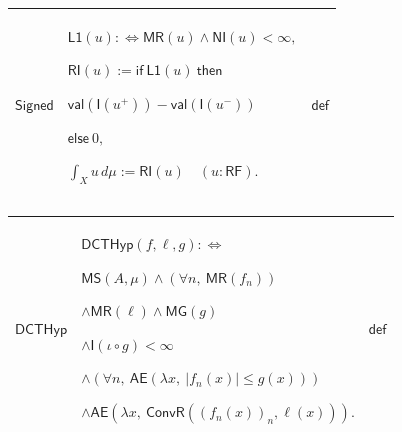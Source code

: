 \documentclass[11pt]{amsart}
\newlength{\FTCThreeColumnBody}
\begin{document}
{\begin{tabular}{|@{}>{\centering\arraybackslash}m{0.251968\FTCThreeColumnBody}|>{\centering\arraybackslash}m{0.590551\FTCThreeColumnBody}|>{\centering\arraybackslash}m{0.157480\FTCThreeColumnBody}|}
\end{tabular}%
\par\setlength{\parskip}{0pt}\nointerlineskip
\noindent
\begin{tabular}{|@{}>{\centering\arraybackslash}m{0.251968\FTCThreeColumnBody}|>{\centering\arraybackslash}m{0.590551\FTCThreeColumnBody}|>{\centering\arraybackslash}m{0.157480\FTCThreeColumnBody}|}\hline
\hypertarget{dctdef:Signed}{$\displaystyle \textsf{Signed}$} & $\displaystyle \textsf{L1}(u):\Longleftrightarrow\textsf{MR}(u)\land\textsf{NI}(u)<\infty,$\par
$\displaystyle \textsf{RI}(u):=\textsf{if}\ \textsf{L1}(u)\ \textsf{then}$\par
$\displaystyle \textsf{val}(\textsf{I}(u^+))-\textsf{val}(\textsf{I}(u^-))$\par
$\displaystyle \textsf{else}\ 0,$\par
$\displaystyle \int_Xu\,d\mu:=\textsf{RI}(u)\quad(u:\textsf{RF}).$ & $\displaystyle \textsf{def}$\\ \hline
\end{tabular}%
\par\setlength{\parskip}{0pt}\nointerlineskip
\noindent
\begin{tabular}{|@{}>{\centering\arraybackslash}m{0.251968\FTCThreeColumnBody}|>{\centering\arraybackslash}m{0.590551\FTCThreeColumnBody}|>{\centering\arraybackslash}m{0.157480\FTCThreeColumnBody}|}\hline
\hypertarget{dctdef:DCTHyp}{$\displaystyle \textsf{DCTHyp}$} & $\displaystyle \textsf{DCTHyp}(f,\ell,g):\Longleftrightarrow$\par
$\displaystyle \textsf{MS}(A,\mu)\land(\forall n,\ \textsf{MR}(f_n))$\par
$\displaystyle \land\textsf{MR}(\ell)\land\textsf{MG}(g)$\par
$\displaystyle \land\textsf{I}(\iota\circ g)<\infty$\par
$\displaystyle \land(\forall n,\ \textsf{AE}(\lambda x,\ |f_n(x)|\le g(x)))$\par
$\displaystyle \land\textsf{AE}(\lambda x,\ \textsf{ConvR}((f_n(x))_n,\ell(x))).$ & $\displaystyle \textsf{def}$\\ \hline
\end{tabular}%
\par\setlength{\parskip}{0pt}\nointerlineskip
\noindent
\begin{tabular}{|@{}>{\centering\arraybackslash}m{0.251968\FTCThreeColumnBody}|>{\centering\arraybackslash}m{0.590551\FTCThreeColumnBody}|>{\centering\arraybackslash}m{0.157480\FTCThreeColumnBody}|}\hline

\end{tabular}}
\end{document}
